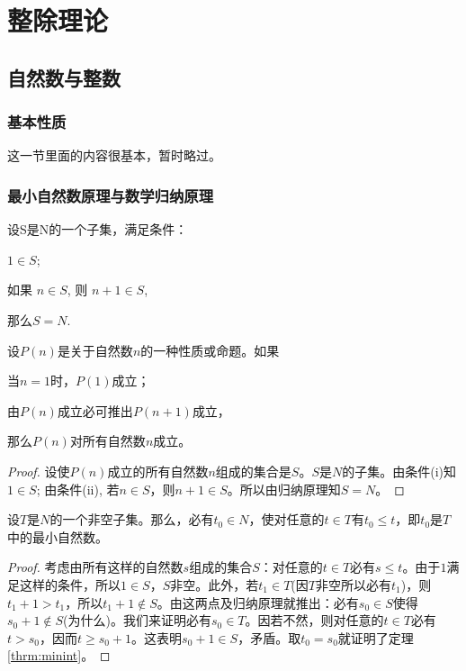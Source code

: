 \chapter{整除理论}
\section{自然数与整数}
\subsection{基本性质}
这一节里面的内容很基本，暂时略过。
\subsection{最小自然数原理与数学归纳原理}
\begin{axiom}[归纳原(公)理] 设S是N的一个子集，满足条件：
	\begin{axiomenum}
		\item $1 \in S$;
		\item 如果 $n \in S$, 则 $n + 1 \in S$,
	\end{axiomenum}
	那么$S=N$.
\end{axiom}

\begin{theorem}[数学归纳法] 设$P(n)$是关于自然数$n$的一种性质或命题。如果
	\begin{axiomenum}
		\item 当$n=1$时，$P(1)$成立；
		\item 由$P(n)$成立必可推出$P(n+1)$成立，
	\end{axiomenum}
	那么$P(n)$对所有自然数$n$成立。
\end{theorem}

\begin{proof}
	设使$P(n)$成立的所有自然数$n$组成的集合是$S$。$S$是$N$的子集。由条件(i)知$1 \in S$;	由条件(ii), 若$n \in S$，则$n + 1 \in S$。所以由归纳原理知$S=N$。
\end{proof}

\begin{theorem}[最小自然数原理]\label{thrm:minint}
	设$T$是$N$的一个非空子集。那么，必有$t_0 \in N$，使对任意的$t \in T$有$t_0 \le t$，即$t_0$是$T$中的最小自然数。
\end{theorem}

\begin{proof}
	考虑由所有这样的自然数$s$组成的集合$S$：对任意的$t \in T$必有$s \le t$。由于$1$满足这样的条件，所以$1 \in
		S$，$S$非空。此外，若$t_1 \in T$(因$T$非空所以必有$t_1$)，则$t_1 + 1 > t_1$，所以$t_1 + 1 \notin
		S$。由这两点及归纳原理就推出：必有$s_0 \in S$使得$s_0 + 1 \notin S$(为什么)。我们来证明必有$s_0 \in
		T$。因若不然，则对任意的$t \in T$必有$t>s_0$，因而$t \ge s_0 + 1$。这表明$s_0 + 1 \in S$，矛盾。取$t_0 =
		s_0$就证明了定理\ref{thrm:minint}。
\end{proof}

